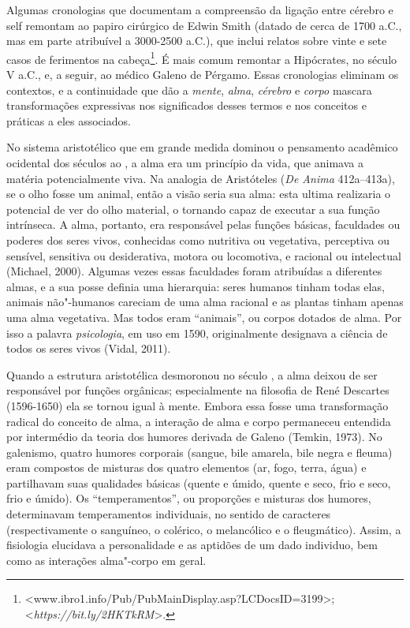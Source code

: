 Algumas cronologias que documentam a compreensão da ligação entre
cérebro e self remontam ao papiro cirúrgico de Edwin Smith (datado de
cerca de 1700 a.C., mas em parte atribuível a 3000-2500 a.C.), que
inclui relatos sobre vinte e sete casos de ferimentos na
cabeça\footnote[6]{\textless{}www.ibro1.info/Pub/PubMainDisplay.asp?LCDocsID=3199\textgreater{};\\\textless{}\emph{https://bit.ly/2HKTkRM}\textgreater{}.}. É mais comum remontar a Hipócrates, no século
V a.C., e, a seguir, ao médico Galeno de Pérgamo. Essas cronologias
eliminam os contextos, e a continuidade que dão a \emph{mente},
\emph{alma}, \emph{cérebro} e \emph{corpo} mascara transformações
expressivas nos significados desses termos e nos conceitos e práticas a
eles associados. 

No sistema aristotélico que em grande medida dominou o pensamento
acadêmico ocidental dos séculos  ao , a alma era um princípio da
vida, que animava a matéria potencialmente viva. Na analogia de
Aristóteles (\emph{De Anima} 412a--413a), se o olho fosse um animal,
então a visão seria sua alma: esta ultima realizaria o potencial de ver
do olho material, o tornando capaz de executar a sua função intrínseca.
A alma, portanto, era responsável pelas funções básicas, faculdades ou
poderes dos seres vivos, conhecidas como nutritiva ou vegetativa,
perceptiva ou sensível, sensitiva ou desiderativa, motora ou locomotiva,
e racional ou intelectual (Michael, 2000). Algumas vezes essas
faculdades foram atribuídas a diferentes almas, e a sua posse definia
uma hierarquia: seres humanos tinham todas elas, animais não"-humanos
careciam de uma alma racional e as plantas tinham apenas uma alma
vegetativa. Mas todos eram ``animais'', ou corpos dotados de alma. Por
isso a palavra \emph{psicologia}, em uso em 1590, originalmente
designava a ciência de todos os seres vivos (Vidal, 2011).

Quando a estrutura aristotélica desmoronou no século , a alma deixou
de ser responsável por funções orgânicas; especialmente na filosofia de
René Descartes (1596-1650) ela se tornou igual à mente. Embora essa
fosse uma transformação radical do conceito de alma, a interação de alma
e corpo permaneceu entendida por intermédio da teoria dos humores
derivada de Galeno (Temkin, 1973). No galenismo, quatro humores
corporais (sangue, bile amarela, bile negra e fleuma) eram compostos de
misturas dos quatro elementos (ar, fogo, terra, água) e partilhavam suas
qualidades básicas (quente e úmido, quente e seco, frio e seco, frio e
úmido). Os ``temperamentos'', ou proporções e misturas dos humores,
determinavam temperamentos individuais, no sentido de caracteres
(respectivamente o sanguíneo, o colérico, o melancólico e o
fleugmático). Assim, a fisiologia elucidava a personalidade e as
aptidões de um dado individuo, bem como as interações alma"-corpo em
geral.

